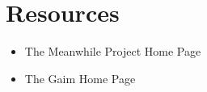 

\chapter{Resources}

\begin{itemize}
\item The Meanwhile Project Home Page\\\hreflink{\meanwhileURL}
\item The Gaim Home Page\\\hreflink{\gaimURL}
\end{itemize}
